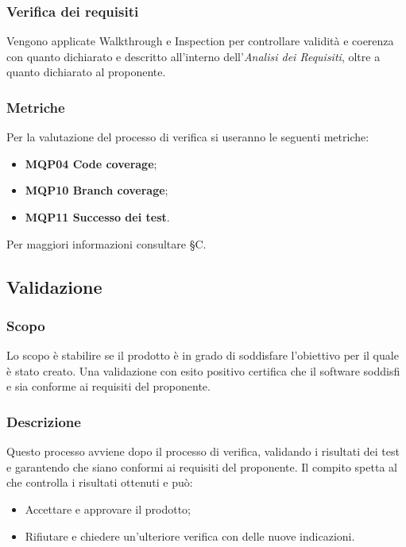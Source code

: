 \subsubsection{Verifica dei requisiti}
Vengono applicate Walkthrough e Inspection per controllare validità e coerenza con quanto dichiarato e descritto all'interno dell'\textit{Analisi dei Requisiti}, oltre a quanto dichiarato al proponente.

\subsubsection{Metriche}
Per la valutazione del processo di verifica si useranno le seguenti metriche:
\begin{itemize}
\item \textbf{MQP04 Code coverage};
\item \textbf{MQP10 Branch coverage};
\item \textbf{MQP11 Successo dei test}.
\end{itemize}

Per maggiori informazioni consultare §C.

\subsection{Validazione}
\subsubsection{Scopo}
Lo scopo è stabilire se il prodotto è in grado di soddisfare l'obiettivo per il quale è stato creato. Una validazione con esito positivo certifica che il software soddisfi e sia conforme ai requisiti del proponente.

\subsubsection{Descrizione}
Questo processo avviene dopo il processo di verifica, validando i risultati dei test e garantendo che siano conformi ai requisiti del proponente. Il compito spetta al \RE che controlla i risultati ottenuti e può:
\begin{itemize}
\item Accettare e approvare il prodotto;
\item Rifiutare e chiedere un'ulteriore verifica con delle nuove indicazioni.
\end{itemize}

